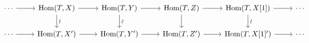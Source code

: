 \documentclass[12pt]{standalone}
\begin{document}
        $$

\begin{tikzcd}
\cdots \ar[r] & \operatorname{Hom}(T,X) \ar[r] \ar[d,"\sim"{sloped}] 
& \operatorname{Hom}(T,Y) \ar[r] \ar[d, "\sim"{sloped}] & 
\operatorname{Hom}(T,Z) \ar[r] \ar[d] & \operatorname{Hom}(T,X[1]) \ar[r] \ar[d,"\sim"{sloped}] & \cdots \\
\cdots \ar[r]  & \operatorname{Hom}(T,X^\prime) \ar[r]  & \operatorname{Hom}(T,Y^\prime) \ar[r]  & 
\operatorname{Hom}(T,Z^\prime) \ar[r]  & \operatorname{Hom}(T,X[1]^\prime) \ar[r]  & \cdots \\
\end{tikzcd}
        $$
        
\end{document}
